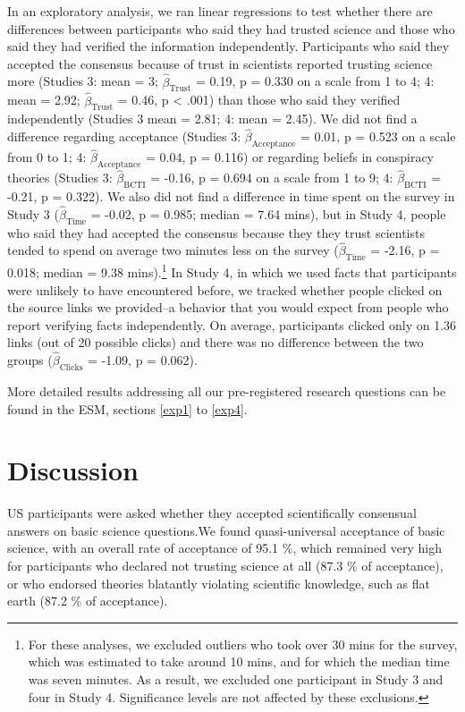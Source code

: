 \documentclass[
  doc,floatsintext]{apa6}
\begin{document}
In an exploratory analysis, we ran linear regressions to test whether there are differences between participants who said they had trusted science and those who said they had verified the information independently. Participants who said they accepted the consensus because of trust in scientists reported trusting science more (Studies 3: mean = 3; \(\hat{\beta}_{\text{Trust}}\) = 0.19, p = 0.330 on a scale from 1 to 4; 4: mean = 2.92; \(\hat{\beta}_{\text{Trust}}\) = 0.46, p \textless{} .001) than those who said they verified independently (Studies 3 mean = 2.81; 4: mean = 2.45). We did not find a difference regarding acceptance (Studies 3: \(\hat{\beta}_{\text{Acceptance}}\) = 0.01, p = 0.523 on a scale from 0 to 1; 4: \(\hat{\beta}_{\text{Acceptance}}\) = 0.04, p = 0.116) or regarding beliefs in conspiracy theories (Studies 3: \(\hat{\beta}_{\text{BCTI}}\) = -0.16, p = 0.694 on a scale from 1 to 9; 4: \(\hat{\beta}_{\text{BCTI}}\) = -0.21, p = 0.322). We also did not find a difference in time spent on the survey in Study 3 (\(\hat{\beta}_{\text{Time}}\) = -0.02, p = 0.985; median = 7.64 mins), but in Study 4, people who said they had accepted the consensus because they they trust scientists tended to spend on average two minutes less on the survey (\(\hat{\beta}_{\text{Time}}\) = -2.16, p = 0.018; median = 9.38 mins).\footnote{For these analyses, we excluded outliers who took over 30 mins for the survey, which was estimated to take around 10 mins, and for which the median time was seven minutes. As a result, we excluded one participant in Study 3 and four in Study 4. Significance levels are not affected by these exclusions.} In Study 4, in which we used facts that participants were unlikely to have encountered before, we tracked whether people clicked on the source links we provided--a behavior that you would expect from people who report verifying facts independently. On average, participants clicked only on 1.36 links (out of 20 possible clicks) and there was no difference between the two groups (\(\hat{\beta}_{\text{Clicks}}\) = -1.09, p = 0.062).

More detailed results addressing all our pre-registered research questions can be found in the ESM, sections \ref{exp1} to \ref{exp4}.

\section{Discussion}\label{discussion}

US participants were asked whether they accepted scientifically consensual answers on basic science questions.We found quasi-universal acceptance of basic science, with an overall rate of acceptance of 95.1 \%, which remained very high for participants who declared not trusting science at all (87.3 \% of acceptance), or who endorsed theories blatantly violating scientific knowledge, such as flat earth (87.2 \% of acceptance).
\end{document}
